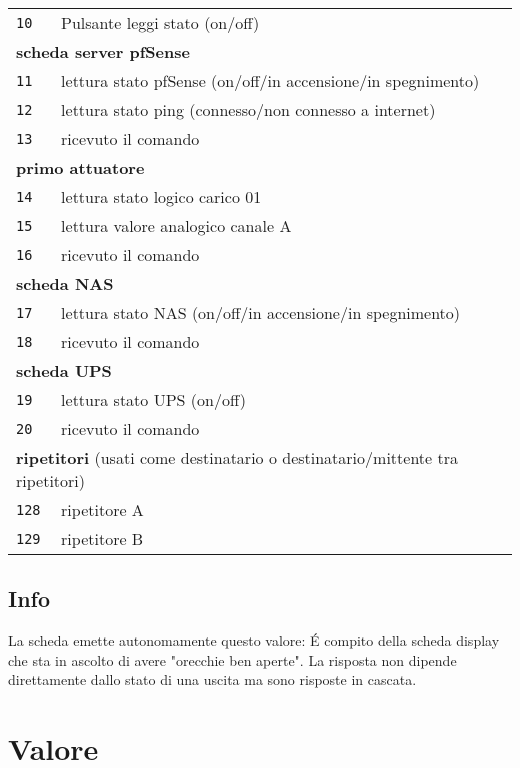 \documentclass[italian]{article}
\begin{document}
\begin{tabular}{ll}
			\texttt{10} & Pulsante leggi stato (on/off)\\			
            \multicolumn{2}{l}{\textbf{scheda server pfSense}}\\
            \texttt{11} & lettura stato pfSense (on/off/in accensione/in spegnimento)\\        
            \texttt{12} & lettura stato ping (connesso/non connesso a internet)\\            
            \texttt{13} & ricevuto il comando\\
            \multicolumn{2}{l}{\textbf{primo attuatore}}\\
		    \texttt{14} & lettura stato logico carico 01\\ 
		    \texttt{15} & lettura valore analogico canale A\\ 		      		             
			\texttt{16} & ricevuto il comando\\
			\multicolumn{2}{l}{\textbf{scheda NAS}}\\
			\texttt{17} & lettura stato NAS (on/off/in accensione/in spegnimento)\\
			\texttt{18} & ricevuto il comando\\
			\multicolumn{2}{l}{\textbf{scheda UPS}}\\
			\texttt{19} & lettura stato UPS (on/off)\\
			\texttt{20} & ricevuto il comando\\
			\multicolumn{2}{l}{\textbf{ripetitori} (usati come destinatario o destinatario/mittente tra ripetitori)}\\
			\texttt{128} & ripetitore A\\    
			\texttt{129} & ripetitore B\\ 
        \end{tabular}

    \subsection*{Info}
    
    La scheda emette autonomamente questo valore: \'E compito della scheda display che sta in ascolto di avere "orecchie ben aperte". La risposta non dipende direttamente dallo stato di una uscita ma sono risposte in cascata.
    
    \section*{Valore}
    
\end{document}
